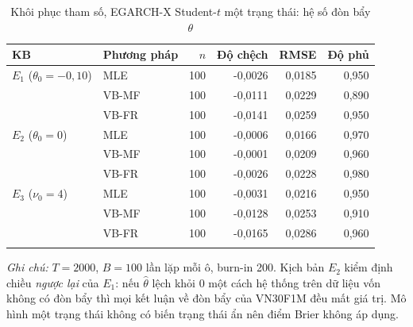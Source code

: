 \begin{table}[H]
\centering\footnotesize
\caption{Khôi phục tham số, EGARCH-X Student-$t$ một trạng thái: hệ số đòn bẩy $\theta$}
\label{tab:prb-theta}
\begin{tabular}{llrrrr}
\toprule
\textbf{KB} & \textbf{Phương pháp} & $n$ & Độ chệch & RMSE & Độ phủ \\
\midrule
$E_{1}$ ($\theta_0 = -0{,}10$) & MLE & 100 & -0,0026 & 0,0185 & 0,950 \\
 & VB-MF & 100 & -0,0111 & 0,0229 & 0,890 \\
 & VB-FR & 100 & -0,0141 & 0,0259 & 0,950 \\
\addlinespace[0.2em]
$E_{2}$ ($\theta_0 = 0$) & MLE & 100 & -0,0006 & 0,0166 & 0,970 \\
 & VB-MF & 100 & -0,0001 & 0,0209 & 0,960 \\
 & VB-FR & 100 & -0,0026 & 0,0228 & 0,980 \\
\addlinespace[0.2em]
$E_{3}$ ($\nu_0 = 4$) & MLE & 100 & -0,0031 & 0,0216 & 0,950 \\
 & VB-MF & 100 & -0,0128 & 0,0253 & 0,910 \\
 & VB-FR & 100 & -0,0165 & 0,0286 & 0,960 \\
\addlinespace[0.2em]
\bottomrule
\end{tabular}
\vspace{0.3em}
\raggedright\scriptsize
\emph{Ghi chú:} $T = 2000$, $B = 100$ lần lặp mỗi ô, burn-in 200. Kịch bản $E_2$ kiểm định chiều \emph{ngược lại} của $E_1$: nếu $\hat\theta$ lệch khỏi 0 một cách hệ thống trên dữ liệu vốn không có đòn bẩy thì mọi kết luận về đòn bẩy của VN30F1M đều mất giá trị. Mô hình một trạng thái không có biến trạng thái ẩn nên điểm Brier không áp dụng.
\end{table}

